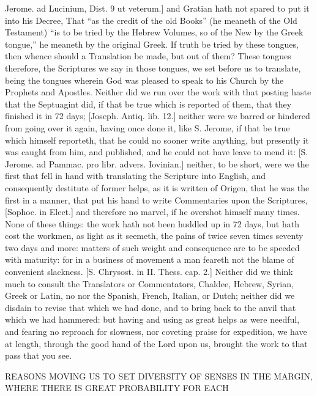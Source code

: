 {Jerome. ad Lucinium, Dist. 9 ut veterum.] and Gratian hath not spared to put it into his Decree, That “as the credit of the old Books” (he meaneth of the Old Testament) “is to be tried by the Hebrew Volumes, so of the New by the Greek tongue,” he meaneth by the original Greek. If truth be tried by these tongues, then whence should a Translation be made, but out of them? These tongues therefore, the Scriptures we say in those tongues, we set before us to translate, being the tongues wherein God was pleased to speak to his Church by the Prophets and Apostles. Neither did we run over the work with that posting haste that the Septuagint did, if that be true which is reported of them, that they finished it in 72 days; [Joseph. Antiq. lib. 12.] neither were we barred or hindered from going over it again, having once done it, like S. Jerome, if that be true which himself reporteth, that he could no sooner write anything, but presently it was caught from him, and published, and he could not have leave to mend it: [S. Jerome. ad Pammac. pro libr. advers. Iovinian.] neither, to be short, were we the first that fell in hand with translating the Scripture into English, and consequently destitute of former helps, as it is written of Origen, that he was the first in a manner, that put his hand to write Commentaries upon the Scriptures, [Sophoc. in Elect.] and therefore no marvel, if he overshot himself many times. None of these things: the work hath not been huddled up in 72 days, but hath cost the workmen, as light as it seemeth, the pains of twice seven times seventy two days and more: matters of such weight and consequence are to be speeded with maturity: for in a business of movement a man feareth not the blame of convenient slackness. [S. Chrysost. in II. Thess. cap. 2.] Neither did we think much to consult the Translators or Commentators, Chaldee, Hebrew, Syrian, Greek or Latin, no nor the Spanish, French, Italian, or Dutch; neither did we disdain to revise that which we had done, and to bring back to the anvil that which we had hammered: but having and using as great helps as were needful, and fearing no reproach for slowness, nor coveting praise for expedition, we have at length, through the good hand of the Lord upon us, brought the work to that pass that you see.
\par }{\IS REASONS MOVING US TO SET DIVERSITY OF SENSES IN THE MARGIN, WHERE THERE IS GREAT PROBABILITY FOR EACH
}
